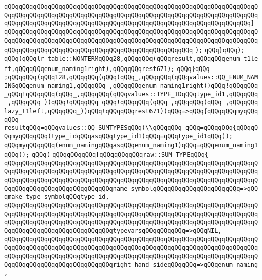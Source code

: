 \verb|qQQqqQQqqQQqqQQqqQQqqQQqqQQqqQQqqQQqqQQqqQQqqQQqqQQqqQQqqQQqqQQqqQQqqQQqqQQqqQQqqQQqqQQqqQQqqQQqqQQqqQQqqQQqqQQqqQQqqQQqqQQqqQQqqQQqqQQqqQQqqQQqqQQqqQQqqQQqqQQqqQQqqQQqqQQqqQQqqQQqqQQqqQQqqQQqqQQqqQQqqQQqqQQq]|\newline
\verb|qQQqqQQqqQQqqQQqqQQqqQQqqQQqqQQqqQQqqQQqqQQqqQQqqQQqqQQqqQQqqQQqqQQqqQQqqQQqqQQqqQQqqQQqqQQqqQQqqQQqqQQqqQQqqQQqqQQqqQQqqQQqqQQqqQQqqQQqqQQqqQQqqQQqqQQqqQQqqQQqqQQqqQQqqQQqqQQqqQQqqQQqqQQqqQQq|\newline
\verb|);|\newline
\verb|qQQq}qQQq);|\newline
\verb|qQQq(qQQqlr_table::NONTERMqQQq28,qQQqqQQq(qQQqresult,qQQqqQQqenum_t1left,qQQqqQQqenum_naming1right),qQQqqQQqrest671);|\newline
\verb|qQQq}qQQq|\newline
\verb|;qQQqqQQq(qQQq128,qQQqqQQq(qQQq(qQQq_,qQQqqQQq(qQQqvalues::QQ_ENUM_NAMINGqQQqenum_naming1,qQQqqQQq_,qQQqqQQqenum_naming1right))qQQq!qQQqqQQq_qQQq!qQQqqQQq(qQQq_,qQQqqQQq(qQQqvalues::TYPE_IDqQQqtype_id1,qQQqqQQq_,qQQqqQQq_))qQQq!qQQqqQQq_qQQq!qQQqqQQq(qQQq_,qQQqqQQq(qQQq_,qQQqqQQqlazy_t1left,qQQqqQQq_))qQQq!qQQqqQQqrest671))qQQq=>qQQq{qQQqqQQqmyqQQqqQQq|\newline
\verb|resultqQQq=qQQqvalues::QQ_SUMTYPESqQQq(\\qQQqqQQq_qQQq=qQQqqQQq{qQQqqQQqmyqQQqqQQq(type_idqQQqasqQQqtype_id1)qQQq=qQQqtype_id1qQQq();|\newline
\verb|qQQqmyqQQqqQQq(enum_namingqQQqasqQQqenum_naming1)qQQq=qQQqenum_naming1qQQq();|\newline
\verb|qQQq(|\newline
\verb|qQQqqQQqqQQq[qQQqqQQqqQQqraw::SUM_TYPEqQQq{|\newline
\verb|qQQqqQQqqQQqqQQqqQQqqQQqqQQqqQQqqQQqqQQqqQQqqQQqqQQqqQQqqQQqqQQqqQQqqQQqqQQqqQQqqQQqqQQqqQQqqQQqqQQqqQQqqQQqqQQqqQQqqQQqqQQqqQQqqQQqqQQqqQQqqQQqqQQqqQQqqQQqqQQqqQQqqQQqqQQqqQQqqQQqqQQqqQQqqQQqqQQqqQQqqQQqqQQqqQQqqQQqqQQqqQQqqQQqqQQqqQQqqQQqname_symbolqQQqqQQqqQQqqQQqqQQqqQQq=>qQQqmake_type_symbolqQQqtype_id,|\newline
\verb|qQQqqQQqqQQqqQQqqQQqqQQqqQQqqQQqqQQqqQQqqQQqqQQqqQQqqQQqqQQqqQQqqQQqqQQqqQQqqQQqqQQqqQQqqQQqqQQqqQQqqQQqqQQqqQQqqQQqqQQqqQQqqQQqqQQqqQQqqQQqqQQqqQQqqQQqqQQqqQQqqQQqqQQqqQQqqQQqqQQqqQQqqQQqqQQqqQQqqQQqqQQqqQQqqQQqqQQqqQQqqQQqqQQqqQQqqQQqqQQqtypevarsqQQqqQQqqQQq=>qQQqNIL,|\newline
\verb|qQQqqQQqqQQqqQQqqQQqqQQqqQQqqQQqqQQqqQQqqQQqqQQqqQQqqQQqqQQqqQQqqQQqqQQqqQQqqQQqqQQqqQQqqQQqqQQqqQQqqQQqqQQqqQQqqQQqqQQqqQQqqQQqqQQqqQQqqQQqqQQqqQQqqQQqqQQqqQQqqQQqqQQqqQQqqQQqqQQqqQQqqQQqqQQqqQQqqQQqqQQqqQQqqQQqqQQqqQQqqQQqqQQqqQQqqQQqqQQqright_hand_sideqQQqqQQq=>qQQqenum_naming,|\newline
